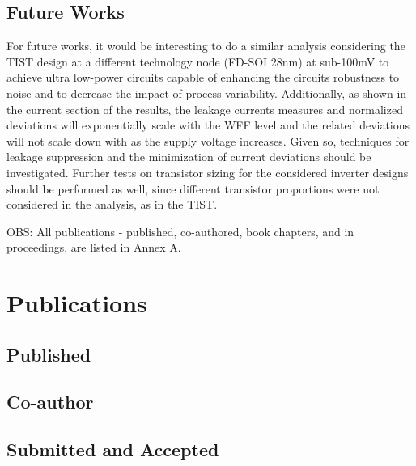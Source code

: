 \documentclass[pgmicro,diss,english]{iiufrgs}
\begin{document}
\section{Future Works}

For future works, it would be interesting to do a similar analysis  considering the TIST design at a different technology node (FD-SOI 28nm) at sub-100mV to achieve ultra low-power circuits capable of enhancing the circuits robustness to noise and to decrease the impact of process variability. Additionally, as shown in the current section of the results, the leakage currents measures and normalized deviations will exponentially scale with the WFF level and the related deviations will not scale down with as the supply voltage increases. Given so, techniques for leakage suppression and the minimization of current deviations should be investigated. Further tests on transistor sizing for the considered inverter designs should be performed as well, since different transistor proportions were not considered in the analysis, as in the TIST. 


\vspace{1cm}
OBS: All publications - published, co-authored, book chapters, and in proceedings, are listed in Annex A.





\annex
\chapter{Publications}

\section{Published}
\nobibliography*




\section{Co-author}


\section{Submitted and Accepted}
\end{document}
